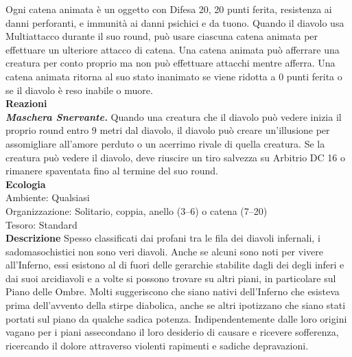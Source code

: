 \begin{multicols}{2}
Ogni catena animata è un oggetto con Difesa 20, 20 punti ferita, resistenza ai danni perforanti, e immunità ai danni psichici e da tuono. Quando il diavolo usa Multiattacco durante il suo round, può usare ciascuna catena animata per effettuare un ulteriore attacco di catena. Una catena animata può afferrare una creatura per conto proprio ma non può effettuare attacchi mentre afferra. Una catena animata ritorna al suo stato inanimato se viene ridotta a 0 punti ferita o se il diavolo è reso inabile o muore.\\
\textbf{Reazioni}\\
\emph{\textbf{Maschera Snervante.}} Quando una creatura che il diavolo può vedere inizia il proprio round entro 9 metri dal diavolo, il diavolo può creare un'illusione per assomigliare all'amore perduto o un acerrimo rivale di quella creatura. Se la creatura può vedere il diavolo, deve riuscire un tiro salvezza su Arbitrio DC  16 o rimanere spaventata fino al termine del suo round.\\
\textbf{Ecologia}\\
Ambiente: Qualsiasi\\
Organizzazione: Solitario, coppia, anello (3–6) o catena (7–20)\\
Tesoro: Standard\\
\textbf{Descrizione}
Spesso classificati dai profani tra le fila dei diavoli infernali, i sadomasochistici non sono veri diavoli. Anche se alcuni sono noti per vivere all'Inferno, essi esistono al di fuori delle gerarchie stabilite dagli dei degli inferi e dai suoi arcidiavoli e a volte si possono trovare su altri piani, in particolare sul Piano delle Ombre. Molti suggeriscono che siano nativi dell'Inferno che esisteva prima dell'avvento della stirpe diabolica, anche se altri ipotizzano che siano stati portati sul piano da qualche sadica potenza. Indipendentemente dalle loro origini vagano per i piani assecondano il loro desiderio di causare e ricevere sofferenza, ricercando il dolore attraverso violenti rapimenti e sadiche depravazioni.\\


\end{multicols}
